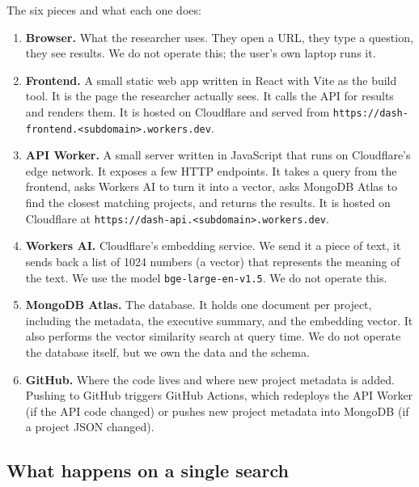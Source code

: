 \documentclass[11pt,a4paper]{article}
\begin{document}
\smallskip
{}

\medskip

The six pieces and what each one does:

\begin{enumerate}[leftmargin=1.5em,itemsep=4pt]
  \item \textbf{Browser.} What the researcher uses. They open a URL, they type a question, they see results. We do not operate this; the user's own laptop runs it.
  \item \textbf{Frontend.} A small static web app written in React with Vite as the build tool. It is the page the researcher actually sees. It calls the API for results and renders them. It is hosted on Cloudflare and served from \texttt{https://dash-frontend.<subdomain>.workers.dev}.
  \item \textbf{API Worker.} A small server written in JavaScript that runs on Cloudflare's edge network. It exposes a few HTTP endpoints. It takes a query from the frontend, asks Workers AI to turn it into a vector, asks MongoDB Atlas to find the closest matching projects, and returns the results. It is hosted on Cloudflare at \texttt{https://dash-api.<subdomain>.workers.dev}.
  \item \textbf{Workers AI.} Cloudflare's embedding service. We send it a piece of text, it sends back a list of 1024 numbers (a vector) that represents the meaning of the text. We use the model \texttt{bge-large-en-v1.5}. We do not operate this.
  \item \textbf{MongoDB Atlas.} The database. It holds one document per project, including the metadata, the executive summary, and the embedding vector. It also performs the vector similarity search at query time. We do not operate the database itself, but we own the data and the schema.
  \item \textbf{GitHub.} Where the code lives and where new project metadata is added. Pushing to GitHub triggers GitHub Actions, which redeploys the API Worker (if the API code changed) or pushes new project metadata into MongoDB (if a project JSON changed).
\end{enumerate}

\subsection{What happens on a single search}
\end{document}

